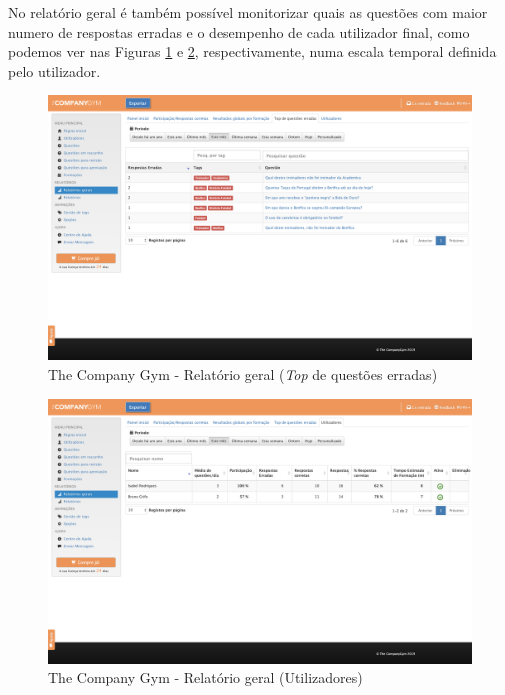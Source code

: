 \newpage


No relatório geral é também possível monitorizar quais as questões com maior numero de respostas erradas e o desempenho de cada utilizador final, como podemos ver nas Figuras \ref{fig:tcg-data3} e \ref{fig:tcg-data4}, respectivamente, numa escala temporal definida pelo utilizador. 

\begin{figure}[ht!]
	\begin{center}
		\includegraphics[width=1\textwidth]{img/tcg/tcg-data3.png}
		\caption{The Company Gym - Relatório geral (\textit{Top} de questões erradas)}
		\label{fig:tcg-data3}
	\end{center}
\end{figure}


\begin{figure}[ht!]
	\begin{center}
		\includegraphics[width=1\textwidth]{img/tcg/tcg-data4.png}
		\caption{The Company Gym - Relatório geral (Utilizadores)}
		\label{fig:tcg-data4}
	\end{center}
\end{figure}

